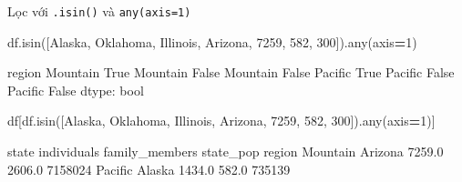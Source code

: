 \documentclass[
]{book}
\newenvironment{Shaded}{\begin{snugshade}}{\end{snugshade}}
\newcommand{\BuiltInTok}[1]{#1}
\newcommand{\DecValTok}[1]{\textcolor[rgb]{0.00,0.00,0.81}{#1}}
\newcommand{\NormalTok}[1]{#1}
\newcommand{\OperatorTok}[1]{\textcolor[rgb]{0.81,0.36,0.00}{\textbf{#1}}}
\newcommand{\StringTok}[1]{\textcolor[rgb]{0.31,0.60,0.02}{#1}}
\begin{document}
Lọc với \texttt{.isin()} và \texttt{any(axis=1)}

\begin{Shaded}
\begin{Highlighting}[]
\NormalTok{df.isin([}\StringTok{\textquotesingle{}Alaska\textquotesingle{}}\NormalTok{, }\StringTok{\textquotesingle{}Oklahoma\textquotesingle{}}\NormalTok{, }\StringTok{\textquotesingle{}Illinois\textquotesingle{}}\NormalTok{, }\StringTok{\textquotesingle{}Arizona\textquotesingle{}}\NormalTok{, }\DecValTok{7259}\NormalTok{, }\DecValTok{582}\NormalTok{, }\DecValTok{300}\NormalTok{]).}\BuiltInTok{any}\NormalTok{(axis}\OperatorTok{=}\DecValTok{1}\NormalTok{)}
\end{Highlighting}
\end{Shaded}

\begin{Shaded}
\begin{Highlighting}[]
\NormalTok{region}
\NormalTok{Mountain     True}
\NormalTok{Mountain    False}
\NormalTok{Mountain    False}
\NormalTok{Pacific      True}
\NormalTok{Pacific     False}
\NormalTok{Pacific     False}
\NormalTok{dtype: bool}
\end{Highlighting}
\end{Shaded}

\begin{Shaded}
\begin{Highlighting}[]
\NormalTok{df[df.isin([}\StringTok{\textquotesingle{}Alaska\textquotesingle{}}\NormalTok{, }\StringTok{\textquotesingle{}Oklahoma\textquotesingle{}}\NormalTok{, }\StringTok{\textquotesingle{}Illinois\textquotesingle{}}\NormalTok{, }\StringTok{\textquotesingle{}Arizona\textquotesingle{}}\NormalTok{, }\DecValTok{7259}\NormalTok{, }\DecValTok{582}\NormalTok{, }\DecValTok{300}\NormalTok{]).}\BuiltInTok{any}\NormalTok{(axis}\OperatorTok{=}\DecValTok{1}\NormalTok{)]}
\end{Highlighting}
\end{Shaded}

\begin{Shaded}
\begin{Highlighting}[]
\NormalTok{            state  individuals  family\_members  state\_pop}
\NormalTok{region                                                   }
\NormalTok{Mountain  Arizona       7259.0          2606.0    7158024}
\NormalTok{Pacific    Alaska       1434.0           582.0     735139}
\end{Highlighting}
\end{Shaded}
\end{document}
